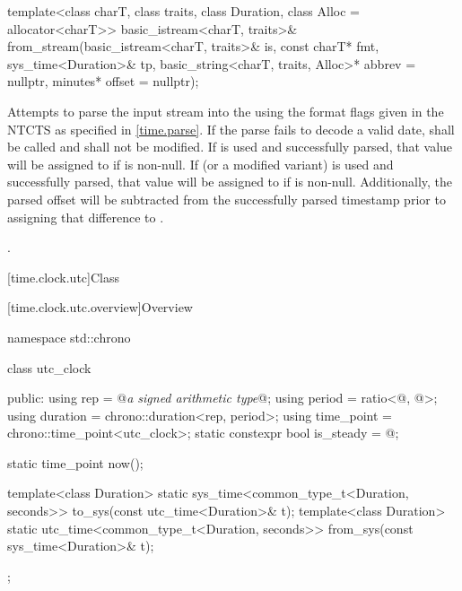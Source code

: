 %
\begin{itemdecl}
template<class charT, class traits, class Duration, class Alloc = allocator<charT>>
  basic_istream<charT, traits>&
    from_stream(basic_istream<charT, traits>& is, const charT* fmt,
                sys_time<Duration>& tp, basic_string<charT, traits, Alloc>* abbrev = nullptr,
                minutes* offset = nullptr);
\end{itemdecl}

\begin{itemdescr}
\pnum
\effects
Attempts to parse the input stream 
into the   using
the format flags given in the NTCTS 
as specified in \ref{time.parse}.
If the parse fails to decode a valid date,
shall be called and  shall not be modified.
If  is used and successfully parsed,
that value will be assigned to  if  is non-null.
If  (or a modified variant) is used and successfully parsed,
that value will be assigned to  if  is non-null.
Additionally, the parsed offset will be subtracted
from the successfully parsed timestamp
prior to assigning that difference to .

\pnum
\returns
{}.
\end{itemdescr}

[time.clock.utc]{Class }

[time.clock.utc.overview]{Overview}
%

\begin{codeblock}
namespace std::chrono {
  class utc_clock {
  public:
    using rep                       = @\textit{a signed arithmetic type}@;
    using period                    = ratio<@\unspecnc@, @\unspec@>;
    using duration                  = chrono::duration<rep, period>;
    using time_point                = chrono::time_point<utc_clock>;
    static constexpr bool is_steady = @\unspec@;

    static time_point now();

    template<class Duration>
      static sys_time<common_type_t<Duration, seconds>>
        to_sys(const utc_time<Duration>& t);
    template<class Duration>
      static utc_time<common_type_t<Duration, seconds>>
        from_sys(const sys_time<Duration>& t);
  };
}
\end{codeblock}

